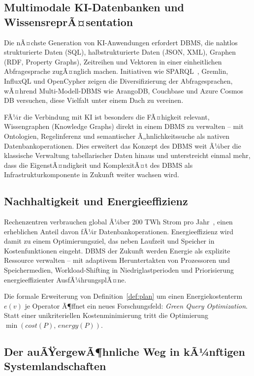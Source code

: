 ﻿\documentclass[a4paper,12pt]{article}
\theoremstyle{definition}
\begin{document}
\subsection{Multimodale KI-Datenbanken und WissensreprÃ¤sentation}

Die nÃ¤chste Generation von KI-Anwendungen erfordert DBMS, die nahtlos strukturierte Daten (SQL), halbstrukturierte Daten (JSON, XML), Graphen (RDF, Property Graphs), Zeitreihen und Vektoren in einer einheitlichen Abfragesprache zugÃ¤nglich machen. Initiativen wie SPARQL~\cite{sparql2013}, Gremlin, InfluxQL und OpenCypher zeigen die Diversifizierung der Abfragesprachen, wÃ¤hrend Multi-Modell-DBMS wie ArangoDB, Couchbase und Azure Cosmos DB versuchen, diese Vielfalt unter einem Dach zu vereinen.

FÃ¼r die Verbindung mit KI ist besonders die FÃ¤higkeit relevant, Wissengraphen (Knowledge Graphs) direkt in einem DBMS zu verwalten -- mit Ontologien, Regelinferenz und semantischer Ã„hnlichkeitssuche als nativen Datenbankoperationen. Dies erweitert das Konzept des DBMS weit Ã¼ber die klassische Verwaltung tabellarischer Daten hinaus und unterstreicht einmal mehr, dass die EigenstÃ¤ndigkeit und KomplexitÃ¤t des DBMS als Infrastrukturkomponente in Zukunft weiter wachsen wird.

\subsection{Nachhaltigkeit und Energieeffizienz}

Rechenzentren verbrauchen global Ã¼ber 200 TWh Strom pro Jahr~\cite{iea2023datacenter}, einen erheblichen Anteil davon fÃ¼r Datenbankoperationen. Energieeffizienz wird damit zu einem Optimierungsziel, das neben Laufzeit und Speicher in Kostenfunktionen eingeht. DBMS der Zukunft werden Energie als explizite Ressource verwalten -- mit adaptivem Heruntertakten von Prozessoren und Speichermedien, Workload-Shifting in Niedriglastperioden und Priorisierung energieeffizienter AusfÃ¼hrungsplÃ¤ne.

Die formale Erweiterung von Definition~\ref{def:plan} um einen Energiekostenterm $e(v)$ je Operator Ã¶ffnet ein neues Forschungsfeld: \emph{Green Query Optimization}. Statt einer unikriteriellen Kostenminimierung tritt die Optimierung \mbox{$\min(\mathit{cost}(P),\, \mathit{energy}(P))$}.

\subsection{Der auÃŸergewÃ¶hnliche Weg in kÃ¼nftigen Systemlandschaften}
\end{document}
